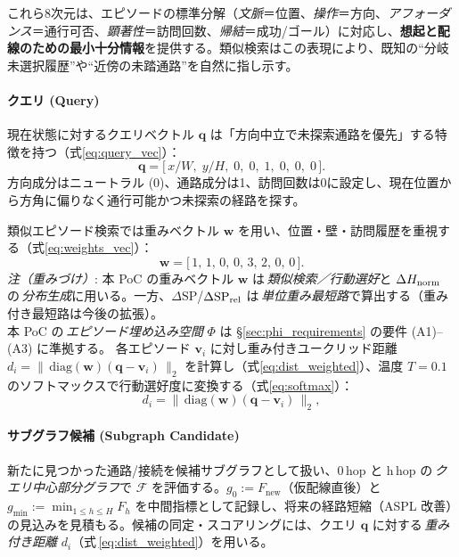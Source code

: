 \documentclass[ja=standard,xelatex]{bxjsarticle}
\newcommand{\F}{\mathcal{F}}
\begin{document}
\noindent これら8次元は、エピソードの標準分解（\emph{文脈}＝位置、\emph{操作}＝方向、\emph{アフォーダンス}＝通行可否、\emph{顕著性}＝訪問回数、\emph{帰結}＝成功/ゴール）に対応し、\textbf{想起と配線のための最小十分情報}を提供する。類似検索はこの表現により、既知の“分岐未選択履歴”や“近傍の未踏通路”を自然に指し示す。

\paragraph{クエリ (Query)}
現在状態に対するクエリベクトル $\mathbf{q}$ は「方向中立で未探索通路を優先」する特徴を持つ（式\ref{eq:query_vec}）：
\begin{equation}
  \mathbf{q}=\big[\,x/W,\; y/H,\; 0,\; 0,\; 1,\; 0,\; 0,\; 0\,\big].\label{eq:query_vec}
\end{equation}
方向成分はニュートラル (0)、通路成分は1、訪問回数は0に設定し、現在位置から方角に偏りなく通行可能かつ未探索の経路を探す。

類似エピソード検索では重みベクトル $\mathbf{w}$ を用い、位置・壁・訪問履歴を重視する（式\ref{eq:weights_vec}）：
\begin{equation}
  \mathbf{w}=\big[\,1,\,1,\,0,\,0,\,3,\,2,\,0,\,0\,\big].\label{eq:weights_vec}
\end{equation}
\noindent\textit{注（重みづけ）}: 本 PoC の重みベクトル $\mathbf{w}$ は\,\emph{類似検索／行動選好}と $\Delta H_{\rm norm}$ の\,\emph{分布生成}に用いる。一方、$\Delta\mathrm{SP}$/$\Delta\mathrm{SP}_{\rm rel}$ は\,\emph{単位重み最短路}で算出する（重み付き最短路は今後の拡張）。\\
\noindent 本 PoC の\,\emph{エピソード埋め込み空間} $\Phi$ は §\ref{sec:phi_requirements} の要件 (A1)–(A3) に準拠する。
各エピソード $\mathbf{v}_i$ に対し重み付きユークリッド距離 $d_i=\lVert\,\mathrm{diag}(\mathbf{w})(\mathbf{q}-\mathbf{v}_i)\,\rVert_2$ を計算し（式\ref{eq:dist_weighted}）、温度 $T=0.1$ のソフトマックスで行動選好度に変換する（式\ref{eq:softmax}）：
\begin{equation}
  d_i=\big\lVert\,\mathrm{diag}(\mathbf{w})(\mathbf{q}-\mathbf{v}_i)\,\big\rVert_2,\label{eq:dist_weighted}
\end{equation}
\paragraph{サブグラフ候補 (Subgraph Candidate)}
新たに見つかった通路/接続を候補サブグラフとして扱い、0\,hop と h\,hop の\,\emph{クエリ中心部分グラフ}で $\F$ を評価する。$g_0{:=}F_{\text{new}}$（仮配線直後）と $g_{\min}{:=}\min_{1\le h\le H}F_h$ を中間指標として記録し、将来の経路短縮（ASPL 改善）の見込みを見積もる。候補の同定・スコアリングには、クエリ $\mathbf{q}$ に対する\,\emph{重み付き距離} $d_i$（式\,\ref{eq:dist_weighted}）を用いる。
\end{document}
